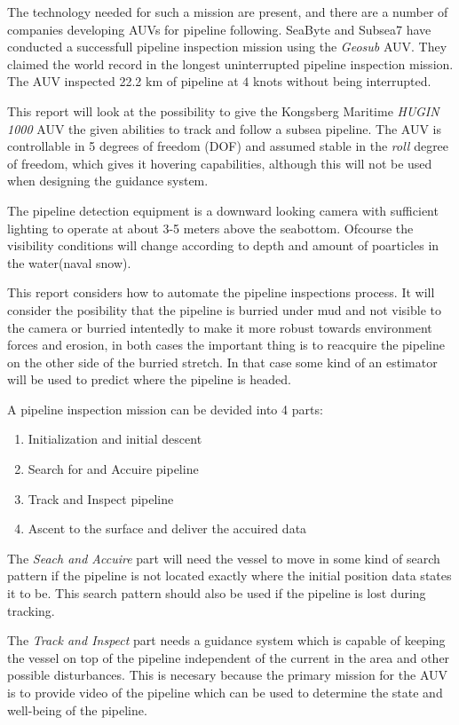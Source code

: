 	The technology needed for such a mission are present, and there are a number of companies developing
	AUVs for pipeline following. SeaByte and Subsea7 have conducted a successfull pipeline inspection
	mission using the \textit{Geosub} AUV. They claimed the world record in the longest uninterrupted
	pipeline inspection mission. The AUV inspected 22.2 km of pipeline at $4$ knots without being
	interrupted. \cite{Seabyte}
	
	This report will look at the possibility to give the Kongsberg Maritime \textit{HUGIN 1000} AUV the
	given abilities to track and follow a subsea pipeline. The AUV is controllable in 5 degrees 
	of freedom (DOF) and assumed stable in the \textit{roll} degree of freedom, which gives it
	hovering capabilities, although this will not be used when designing the guidance system.

	The pipeline detection equipment is a downward looking camera with sufficient lighting to operate at about
	3-5 meters above the seabottom. Ofcourse the visibility conditions will change according to depth and
	amount of poarticles in the water(naval snow). 

	This report considers how to automate the pipeline inspections process. It will consider the
	posibility that the pipeline is burried under mud and not visible to the camera or burried intentedly to
	make it more robust towards environment forces and erosion, in both cases the important thing 
	is to reacquire the pipeline on the other side of the burried stretch. In that case some kind of an estimator
	will be used to predict where the pipeline is headed.
	
	A pipeline inspection mission can be devided into 4 parts:
	\begin{enumerate}
	 \item Initialization and initial descent
	 \item Search for and Accuire pipeline
	 \item Track and Inspect pipeline
	 \item Ascent to the surface and deliver the accuired data
	\end{enumerate}
	
	The \textit{Seach and Accuire} part will need the vessel to move in some kind of search pattern if
	the pipeline is not located exactly where the initial position data states it to be. This search
	pattern should also be used if the pipeline is lost during tracking. 
	
	The \textit{Track and Inspect} part needs a guidance system which is capable of keeping the vessel 
	on top of the pipeline independent of the current in the area and other possible disturbances. This is
	necesary because the primary mission for the AUV is to provide video of the pipeline which can be used
	to determine the state and well-being of the pipeline.
	
